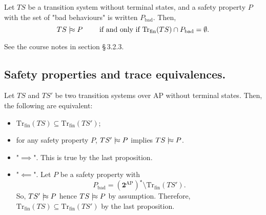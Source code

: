 \documentclass[./main]{subfiles}
\begin{document}
  \begin{prop}
    Let $TS$ be a transition system without terminal states, and a safety property $P$ with the set of "bad behaviours" is written $P_\mathrm{bad}$.
    Then, 
    \[
    TS \mathrel{{|}\!{\approx}} P \quad\quad \text{ if and only if } \mathrm{Tr}_\mathrm{fin}(TS) \cap P_\mathrm{bad} = \emptyset
    .\] 
  \end{prop}
  \begin{prv}
    See the course notes in section §\,3.2.3.
  \end{prv}

  \subsection{Safety properties and trace equivalences.}

  \begin{lem}
    Let $TS$ and $TS'$ be two transition systems over $\mathrm{AP}$ without terminal states.
    Then, the following are equivalent:
    \begin{itemize}
      \item $\mathrm{Tr}_\mathrm{fin}(TS) \subseteq \mathrm{Tr}_\mathrm{fin}(TS')$;
      \item for any safety property $P$, $TS' \mathrel{{|}\!{\approx}} P$ implies $TS \mathrel{{|}\!{\approx}} P$.
    \end{itemize}
  \end{lem}
  \begin{prv}
    \begin{itemize}
      \item "$\implies$". This is true by the last proposition.
      \item "$\impliedby$". 
        Let $P$ be a safety property with \[
        P_\mathrm{bad} = (\mathbf{2}^\mathrm{AP})^\star \setminus \mathrm{Tr}_\mathrm{fin}(TS')
        .\]
        So, $TS' \mathrel{{|}\!{\approx}} P$ hence  $TS \mathrel{{|}\!{\approx}} P$ by assumption.
        Therefore,  $\mathrm{Tr}_\mathrm{fin}(TS) \subseteq \mathrm{Tr}_\mathrm{fin}(TS')$ by the last proposition.
    \end{itemize}
  \end{prv}
\end{document}
